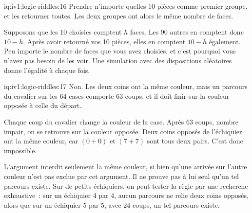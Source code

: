 \begin{solution}{iq:iv1:logic-riddles:16}
Prendre n'importe quelles 10 pièces comme premier groupe, et les retourner toutes. Les deux groupes ont alors le même nombre de faces.

Supposons que les 10 choisies comptent $h$ faces. Les 90 autres en comptent donc $10 - h$. Après avoir retourné vos 10 pièces, elles en comptent $10 - h$ également. Peu importe le nombre de faces que vous avez choisies, et c'est pourquoi vous n'avez pas besoin de les voir. Une simulation avec des dispositions aléatoires donne l'égalité à chaque fois.

\end{solution}

\begin{solution}{iq:iv1:logic-riddles:17}
Non. Les deux coins ont la même couleur, mais un parcours du cavalier sur les 64 cases comporte 63 coups, et il doit finir sur la couleur opposée à celle du départ.

Chaque coup du cavalier change la couleur de la case. Après 63 coups, nombre impair, on se retrouve sur la couleur opposée. Deux coins opposés de l'échiquier ont la même couleur, car $(0 + 0)$ et $(7 + 7)$ sont tous deux pairs. C'est donc impossible.

L'argument interdit seulement la même couleur, si bien qu'une arrivée sur l'autre couleur n'est pas exclue par cet argument. Il ne prouve pas à lui seul qu'un tel parcours existe. Sur de petits échiquiers, on peut tester la règle par une recherche exhaustive~: sur un échiquier 4 par 4, aucun parcours ne relie deux coins opposés, alors que sur un échiquier 5 par 5, avec 24 coups, un tel parcours existe.

\end{solution}

